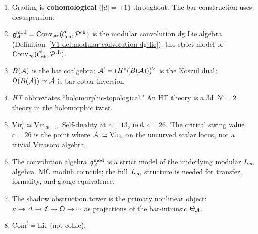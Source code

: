 \begin{enumerate}[label=\textup{(\alph*)}]
\item Grading is \textbf{cohomological} ($|d| = +1$) throughout.
 The bar construction uses desuspension.

\item $\mathfrak{g}_{\mathcal{A}}^{\mathrm{mod}} = \operatorname{Conv}_{\mathrm{str}}(\mathcal{C}^!_{\mathrm{ch}},
 \mathcal{P}^{\mathrm{ch}})$ is the modular convolution dg Lie
 algebra (Definition~\ref*{V1-def:modular-convolution-dg-lie}), the
 strict model of $\operatorname{Conv}_{\infty}(\mathcal{C}^!_{\mathrm{ch}},
 \mathcal{P}^{\mathrm{ch}})$.

\item $B(\mathcal{A})$ is the bar coalgebra; $\mathcal{A}^! = (H^*(B(\mathcal{A})))^\vee$
 is the Koszul dual; $\Omega(B(\mathcal{A})) \simeq \mathcal{A}$ is bar-cobar inversion.

\item \emph{HT} abbreviates ``holomorphic-topological.''
 An HT theory is a 3d $\mathcal{N} = 2$ theory in the holomorphic twist.

\item $\mathrm{Vir}_c^! \simeq \mathrm{Vir}_{26-c}$. Self-duality at
 $c = 13$, \textbf{not} $c = 26$. The critical string value $c = 26$ is
 the point where $\mathcal{A}^! \simeq \mathrm{Vir}_0$ on the uncurved scalar
 locus, not a trivial Virasoro algebra.

\item The convolution algebra $\mathfrak{g}_{\mathcal{A}}^{\mathrm{mod}}$ is a strict model of the
 underlying modular $L_\infty$ algebra. MC moduli coincide; the full
 $L_\infty$ structure is needed for transfer, formality, and gauge
 equivalence.

\item The shadow obstruction tower is the primary nonlinear object:
 $\kappa \to \Delta \to \mathfrak{C} \to \mathfrak{Q} \to \cdots$
 as projections of the bar-intrinsic $\Theta_{\mathcal{A}}$.

\item $\mathrm{Com}^! = \mathrm{Lie}$ (not $\mathrm{coLie}$).
\end{enumerate}














